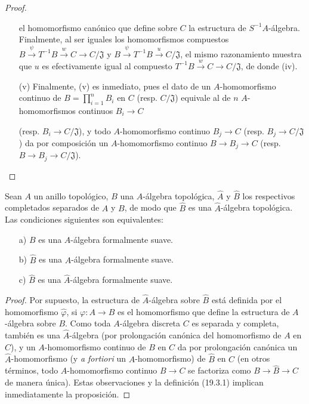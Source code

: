 \begin{proof}
\begin{enumerate}
  el homomorfismo canónico que define sobre $C$ la estructura de
  $S^{-1}A$-álgebra. Finalmente, al ser iguales los homomorfismos compuestos
  $B\xrightarrow{\psi}T^{-1}B\xrightarrow{w}C\to C/\mathfrak J$ y
  $B\xrightarrow{\psi}T^{-1}B\xrightarrow{u}C/\mathfrak J$, el mismo
  razonamiento muestra que $u$ es efectivamente igual al compuesto
  $T^{-1}B\xrightarrow{w}C\to C/\mathfrak J$, de donde (iv).
  \item[(v)] Finalmente, (v) es inmediato, pues el dato de un $A$-homomorfismo
  continuo de $B=\prod_{i=1}^n B_i$ en $C$ (resp. $C/\mathfrak J$)
  equivale al de $n$ $A$-homomorfismos continuos $B_i\to C$

  (resp. $B_i\to C/\mathfrak J$), y todo $A$-homomorfismo continuo
  $B_j\to C$ (resp. $B_j\to C/\mathfrak J$) da por composición un
  $A$-homomorfismo continuo $B\to B_j\to C$
  (resp. $B\to B_j\to C/\mathfrak J$).
\end{enumerate}
\end{proof}



\begin{proposition}[19.3.6]
\label{0.19.3.6-fr}
Sean $A$ un anillo topológico, $B$ una $A$-álgebra topológica, $\hat A$
y $\hat B$ los respectivos completados separados de $A$ y $B$, de modo que
$\hat B$ es una $\hat A$-álgebra topológica. Las condiciones siguientes
son equivalentes:
\begin{enumerate}
  \item[\textup{a)}] $B$ es una $A$-álgebra formalmente suave.
  \item[\textup{b)}] $\hat B$ es una $A$-álgebra formalmente suave.
  \item[\textup{c)}] $\hat B$ es una $\hat A$-álgebra formalmente suave.
\end{enumerate}
\end{proposition}

\begin{proof}
Por supuesto, la estructura de $\hat A$-álgebra sobre $\hat B$ está definida
por el homomorfismo $\hat\varphi$, si $\varphi:A\to B$ es
el homomorfismo que define la estructura de $A$-álgebra sobre $B$. Como toda
$A$-álgebra discreta $C$ es separada y completa, también es una
$\hat A$-álgebra (por prolongación canónica del homomorfismo de $A$ en
$C$), y un $A$-homomorfismo continuo de $B$ en $C$ da por prolongación
canónica un $\hat A$-homomorfismo (y \emph{a fortiori} un
$A$-homomorfismo) de $\hat B$ en $C$ (en otros términos, todo
$A$-homomorfismo continuo $B\to C$ se factoriza como $B\to\hat B\to C$ de manera
única). Estas observaciones y la definición (19.3.1) implican inmediatamente la
proposición.
\end{proof}

